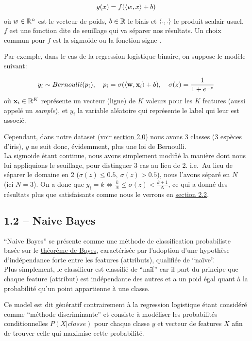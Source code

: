 \documentclass[
]{article}
\begin{document}
\[
g(x) = f(\langle w, x \rangle + b)
\] où \(w \in \mathbb{R}^n\) est le vecteur de poids, \(b \in \mathbb{R}\) le biais et
\(\langle ., . \rangle\) le produit scalair usuel. \(f\) est une fonction
dite de seuillage qui va séparer nos résultats. Un choix commun pour
\(f\) est la sigmoide ou la fonction signe
\cite{ClassifieurLineaire2022}.

Par exemple, dans le cas de la regression logistique binaire, on suppose
le modèle suivant:

\[
y_i \sim Bernoulli(p_i),\quad p_i = \sigma(\langle \mathbf{w}, \mathbf{x}_i \rangle + b),\quad \sigma(z) = \frac{1}{1 + e^{-z}}
\] où \(\mathbf{x}_i \in \mathbb{R}^K\) représente un vecteur (ligne) de \(K\)
valeurs pour les \(K\) features (aussi appelé un \emph{sample}), et
\(y_i\) la variable aléatoire qui représente le label qui leur est
associé.

Cependant, dans notre dataset (voir
\href{#choix-du-dataset-outils-utilisuxe9s}{section 2.0}) nous avons 3
classes (3 espèces d'iris), \(y\) ne suit donc, évidemment, plus une loi
de Bernoulli.\\
La sigmoide étant continue, nous avons simplement modifié la manière
dont nous lui appliquions le seuillage, pour distinguer 3 cas au lieu de
2. i.e.~Au lieu de séparer le domaine en 2
(\(\sigma(z) \leq 0.5,\ \sigma(z) > 0.5\)), nous l'avons séparé en \(N\)
(ici \(N = 3\)). On a donc que
\(y_i = k \Leftrightarrow \frac{k}{N} \leq \sigma(z) < \frac{k + 1}{N}\),
ce qui a donné des résultats plus que satisfaisants comme nous le
verrons en \href{#ruxe9gression-logistique-1}{section 2.2}.

\hypertarget{naive-bayes}{%
\subsection{1.2 -- Naive Bayes}\label{naive-bayes}}

``Naive Bayes'' se présente comme une méthode de classification
probabiliste basée sur le
\href{https://en.wikipedia.org/wiki/Bayes\%27_theorem}{théorème de
Bayes}, caractérisée par l'adoption d'une hypothèse d'indépendance forte
entre les features (attributs), qualifiée de ``naïve''.\\
Plus simplement, le classifieur est classifié de ``naïf'' car il part du
principe que chaque feature (attribut) est indépendante des autres et a
un poid égal quant à la probabilité qu'un point appartienne à une
classe.

Ce model est dit génératif contrairement à la regression logistique
étant considéré comme ``méthode discriminante''
\cite{ClassifieurLineaire2022} et consiste à modéliser les probabilités
conditionnelles \(P(X | classe)\) pour chaque classe \(y\) et vecteur de
features \(X\) afin de trouver celle qui maximise cette probabilité.
\end{document}
